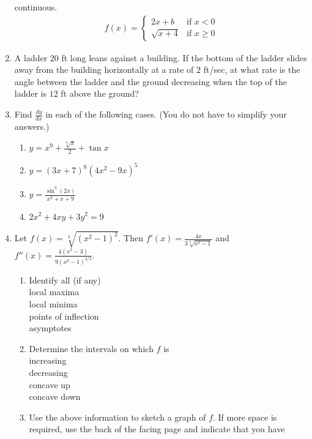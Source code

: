 \documentclass[12pt]{article}
\newcommand{\ds}{\displaystyle}
\begin{document}
\begin{enumerate}
  continuous.
  \begin{align*}
    f(x) = \begin{cases}
      2x+b       & \mbox{if $x<0$}    \\
      \sqrt{x+4} & \mbox{if $x\ge 0$}
    \end{cases}
  \end{align*}
\vfill
\item A
  ladder $20$ ft long leans against a building.  If the bottom of the
  ladder slides away from the building horizontally at a rate of $2$ ft/sec,
  at what rate is the angle between the ladder and the ground decreasing
  when the top of the ladder is $12$ ft above the ground?
\vfill
\vfill
\newpage
\item Find 
  $\ds \frac{dy}{dx}$ in each of the following cases.  (You do not have to
  simplify your answers.)
  \begin{enumerate}
  \item $\ds y=x^9 + \frac{\sqrt[9]{x}}{2} + \tan x$
\vfill
  \item $\ds y = (3x+7)^8 (4x^2-9x)^5$
\vfill
  \item $\ds y = \frac{\sin^3(2x)}{x^2+x+9}$
\vfill
  \item $\ds 2x^2+4xy+3y^2=9$
\vfill
  \end{enumerate}
\newpage
\item Let
  $\ds f(x)=\sqrt[3]{(x^2-1)^2}$.  Then
  $\ds f'(x) = \frac{4x}{3\sqrt[3]{x^2-1}}$ and
  $\ds f''(x) = \frac{4(x^2-3)}{9(x^2-1)^{4/3}}$.
  \begin{enumerate}
  \item Identify all (if any) \\
    local maxima \hrulefill \\
    local minima \hrulefill \\
    points of inflection \hrulefill \\
    asymptotes \hrulefill 
  \item Determine the intervals on which $f$ is \\
    increasing \hrulefill \\
    decreasing \hrulefill \\
    concave up \hrulefill \\
    concave down \hrulefill
  \item Use the above information to sketch a graph of $f$.  If more space
    is required, use the back of the facing page and indicate that you have

\end{enumerate}
\end{enumerate}
\end{document}
